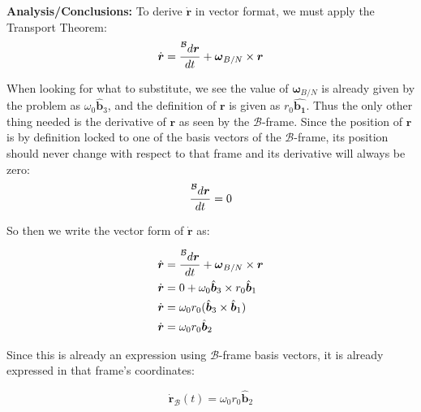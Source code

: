 \documentclass[titlepage]{article}
\begin{document}
\textbf{Analysis/Conclusions:}
To derive $\dot{\boldsymbol{r}}$ in vector format, we must apply the Transport Theorem:
\begin{equation}
	\dot{\boldsymbol{r}}=\frac{\prescript{\mathcal{B}}{}{d}\boldsymbol{r}}{dt}+\boldsymbol{\omega}_{B/N}\times\boldsymbol{r}
\end{equation}

When looking for what to substitute, we see the value of $\boldsymbol{\omega}_{B/N}$ is already given by the problem as $\omega_0\hat{\boldsymbol{b}}_3$, and the definition of $\boldsymbol{r}$ is given as $r_0\hat{\boldsymbol{b_1}}$. Thus the only other thing needed is the derivative of $\boldsymbol{r}$ as seen by the $\mathcal{B}$-frame. Since the position of $\boldsymbol{r}$ is by definition locked to one of the basis vectors of the $\mathcal{B}$-frame, its position should never change with respect to that frame and its derivative will always be zero:
\begin{equation}
	\frac{\prescript{\mathcal{B}}{}{d}\boldsymbol{r}}{dt}=0
\end{equation}

So then we write the vector form of $\dot{\boldsymbol{r}}$ as:
\begin{mdframed}[linewidth=1pt, innertopmargin=10pt, innerbottommargin=10pt]
	\begin{equation}
		\begin{split}
			\dot{\boldsymbol{r}}&=\frac{\prescript{\mathcal{B}}{}{d}\boldsymbol{r}}{dt}+\boldsymbol{\omega}_{B/N}\times\boldsymbol{r}\\
			\dot{\boldsymbol{r}}&=0+\omega_0\hat{\boldsymbol{b}}_3\times r_0\hat{\boldsymbol{b}}_1\\
			\dot{\boldsymbol{r}}&=\omega_0 r_0(\hat{\boldsymbol{b}}_3\times\hat{\boldsymbol{b}}_1)\\
			\dot{\boldsymbol{r}}&=\omega_0 r_0\hat{\boldsymbol{b}}_2
		\end{split}
	\end{equation}
\end{mdframed}

Since this is already an expression using $\mathcal{B}$-frame basis vectors, it is already expressed in that frame's coordinates:
\begin{mdframed}[linewidth=1pt, innertopmargin=10pt, innerbottommargin=10pt]
	\begin{equation}
		\dot{\boldsymbol{r}}_{\mathcal{B}}(t)=\omega_0 r_0\hat{\boldsymbol{b}}_2
	\end{equation}
\end{mdframed}
\end{document}
